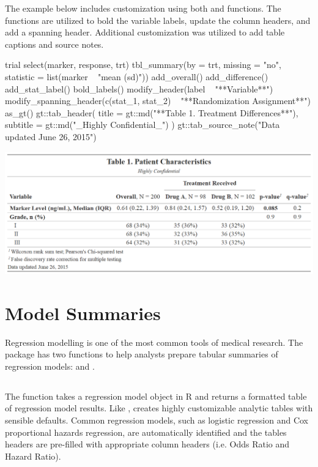 The example below includes customization using both  and  functions.
The  functions are utilized to bold the variable labels,  update the column headers, and add a spanning header.
Additional  customization was utilized to add table captions and source notes.

\begin{example}
trial %
  select(marker, response, trt) %
  tbl_summary(by = trt, 
              missing = "no", 
              statistic = list(marker ~ "{mean} ({sd})")) %
  add_overall() %
  add_difference() %
  add_stat_label() %
  bold_labels() %
  modify_header(label ~ "**Variable**") %
  modify_spanning_header(c(stat_1, stat_2) ~ "**Randomization Assignment**") %
  as_gt() %
  gt::tab_header(
    title = gt::md("**Table 1. Treatment Differences**"),
    subtitle = gt::md("_Highly Confidential_")
  ) %
  gt::tab_source_note("Data updated June 26, 2015")
\end{example}
\begin{widefigure}[h!]
  \includegraphics[scale=0.49]{custom.png}
  \centering
\end{widefigure}

\section{Model Summaries}

Regression modelling is one of the most common tools of medical research.
The  package has two functions to help analysts prepare tabular summaries of regression models:  and .

\subsection{\texorpdfstring{}{tbl\_regression()}}

The  function takes a regression model object in R and returns a formatted table of regression model results. 
Like ,  creates highly customizable analytic tables with sensible defaults.
Common regression models, such as logistic regression and Cox proportional hazards regression, are automatically identified and the tables headers are pre-filled with appropriate column headers (i.e. Odds Ratio and Hazard Ratio).

